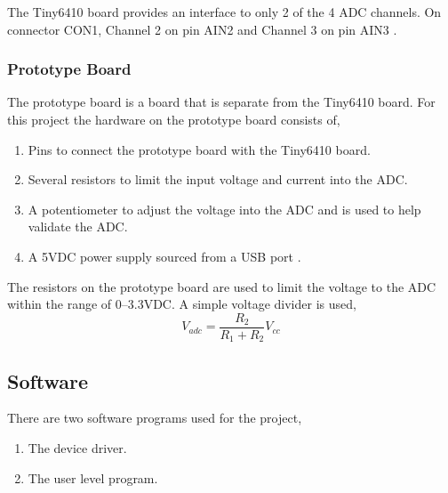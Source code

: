 \documentclass[10pt,conference]{IEEEtran}
\begin{document}
The Tiny6410 board provides an interface to only 2 of the 4 ADC channels. On connector CON1, Channel 2 on pin AIN2 and Channel 3 on pin AIN3 \cite{HWHandout}.

\subsubsection{Prototype Board}\label{ProtoBoard}
The prototype board is a board that is separate from the Tiny6410 board. For this project the hardware on the prototype board consists of,
\begin{enumerate}
	\item Pins to connect the prototype board with the Tiny6410 board.
	\item Several resistors to limit the input voltage and current into the ADC.
	\item A potentiometer to adjust the voltage into the ADC and is used to help validate the ADC.
	\item A 5VDC power supply sourced from a USB port \cite{USB5VDC}.
\end{enumerate}

The resistors on the prototype board are used to limit the voltage to the ADC within the range of 0--3.3VDC. A simple voltage divider is used,
\begin{equation}\label{VoltageDivider}
	V_{adc} = \frac{R_2}{R_1 + R_2}V_{cc}
\end{equation}

\subsection{Software}\label{Software}
There are two software programs used for the project,
\begin{enumerate}
	\item The device driver.
	\item The user level program.
\end{enumerate}
\end{document}
